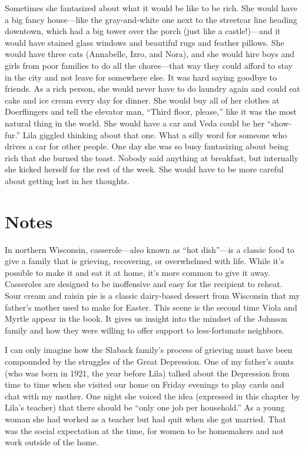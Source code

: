 \documentclass[
  american,
  letterpaper,
]{book}
\begin{document}
Sometimes she fantasized about what it would be like to be rich. She
would have a big fancy house---like the gray-and-white one next to the
streetcar line heading downtown, which had a big tower over the porch
(just like a castle!)---and it would have stained glass windows and
beautiful rugs and feather pillows. She would have three cats
(Annabelle, Izro, and Nora), and she would hire boys and girls from poor
families to do all the chores---that way they could afford to stay in
the city and not leave for somewhere else. It was hard saying goodbye to
friends. As a rich person, she would never have to do laundry again and
could eat cake and ice cream every day for dinner. She would buy all of
her clothes at Doerflingers and tell the elevator man, ``Third floor,
please,'' like it was the most natural thing in the world. She would
have a car and Veda could be her ``show-fur.'' Lila giggled thinking
about that one. What a silly word for someone who drives a car for other
people. One day she was so busy fantasizing about being rich that she
burned the toast. Nobody said anything at breakfast, but internally she
kicked herself for the rest of the week. She would have to be more
careful about getting lost in her thoughts.

\section{Notes}\label{notes-15}

In northern Wisconsin, casserole---also known as ``hot dish''---is a
classic food to give a family that is grieving, recovering, or
overwhelmed with life. While it's possible to make it and eat it at
home, it's more common to give it away. Casseroles are designed to be
inoffensive and easy for the recipient to reheat. Sour cream and raisin
pie is a classic dairy-based dessert from Wisconsin that my father's
mother used to make for Easter. This scene is the second time Viola and
Myrtle appear in the book. It gives us insight into the mindset of the
Johnson family and how they were willing to offer support to
less-fortunate neighbors.

I can only imagine how the Slaback family's process of grieving must
have been compounded by the struggles of the Great Depression. One of my
father's aunts (who was born in 1921, the year before Lila) talked about
the Depression from time to time when she visited our home on Friday
evenings to play cards and chat with my mother. One night she voiced the
idea (expressed in this chapter by Lila's teacher) that there should be
``only one job per household.'' As a young woman she had worked as a
teacher but had quit when she got married. That was the social
expectation at the time, for women to be homemakers and not work outside
of the home.
\end{document}

